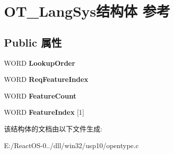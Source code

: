\hypertarget{struct_o_t___lang_sys}{}\section{O\+T\+\_\+\+Lang\+Sys结构体 参考}
\label{struct_o_t___lang_sys}
\subsection*{Public 属性}
\begin{DoxyCompactItemize}
\item 
\mbox{\label{struct_o_t___lang_sys_abaff7e6d936b336873fba9cb10c452b9}} 
W\+O\+RD {\bfseries Lookup\+Order}
\item 
\mbox{\label{struct_o_t___lang_sys_a5a8e318c142ceca26068fd92f99c6998}} 
W\+O\+RD {\bfseries Req\+Feature\+Index}
\item 
\mbox{\label{struct_o_t___lang_sys_af08152843d67234d7563a87250c5861a}} 
W\+O\+RD {\bfseries Feature\+Count}
\item 
\mbox{\label{struct_o_t___lang_sys_a6dd640b27608373b1ec5115b8abc447b}} 
W\+O\+RD {\bfseries Feature\+Index} \mbox{[}1\mbox{]}
\end{DoxyCompactItemize}


该结构体的文档由以下文件生成\+:\begin{DoxyCompactItemize}
\item 
E\+:/\+React\+O\+S-\/0../dll/win32/usp10/opentype.\+c\end{DoxyCompactItemize}
